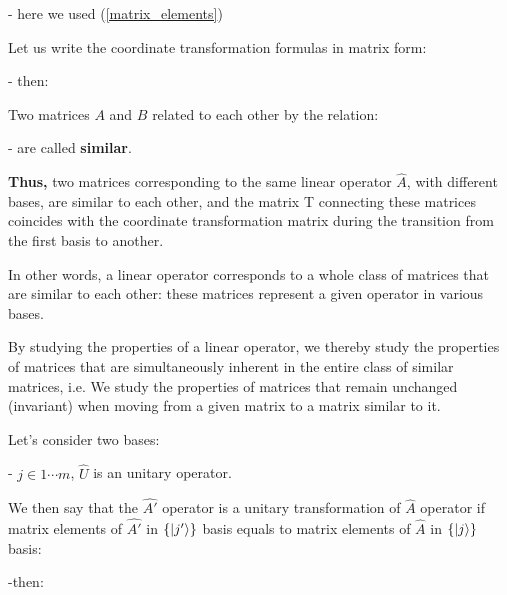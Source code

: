 \documentclass{article}
\begin{document}
- here we used (\ref{matrix_elements})

Let us write the coordinate transformation formulas in matrix form:


- then:



Two matrices $A$ and $B$ related to each other by the relation:


- are called \textbf{similar}.

\textbf{Thus,} two matrices corresponding to the same linear operator $\hat{A}$, with different bases, are similar to each other, and the matrix T connecting these matrices coincides with the coordinate transformation matrix during the transition from the first basis to another.

In other words, a linear operator corresponds to a whole class of matrices that are similar to each other: these matrices represent a given operator in various bases.

By studying the properties of a linear operator, we thereby study the properties of matrices that are simultaneously inherent in the entire class of similar matrices, i.e. We study the properties of matrices that remain unchanged (invariant) when moving from a given matrix to a matrix similar to it.




Let's consider two bases:



- $j \in 1 \cdots m$, $\hat{U}$ is an unitary operator.

We then say that the $\hat{A'}$ operator is a unitary transformation of $\hat{A}$ operator if matrix elements of $\hat{A'}$ in $\lbrace \ket{j{'}} \rbrace$ basis equals to matrix elements of $\hat{A}$ in $\lbrace \ket{j} \rbrace$ basis:


-then:

\end{document}
